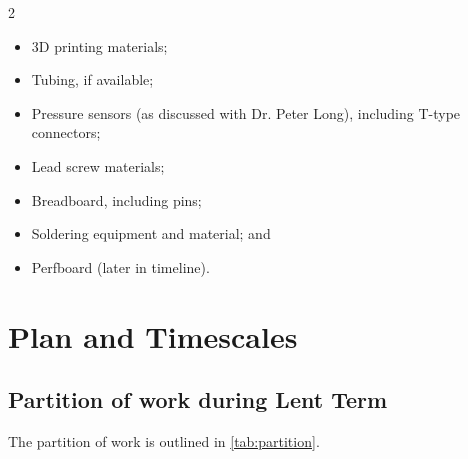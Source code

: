 \documentclass[10pt, a4paper]{article}
\begin{document}
\begin{multicols}{2}
    \begin{itemize}[noitemsep]
        \item 3D printing materials;
        \item Tubing, if available;
        \item Pressure sensors (as discussed with Dr. Peter Long), including T-type connectors;
        \item Lead screw materials;
        \item Breadboard, including pins;
        \item Soldering equipment and material; and
        \item Perfboard (later in timeline).
    \end{itemize}




\end{multicols}
\newpage

\section{Plan and Timescales}

\subsection{Partition of work during Lent Term}
The partition of work is outlined in \autoref{tab:partition}.
\end{document}
